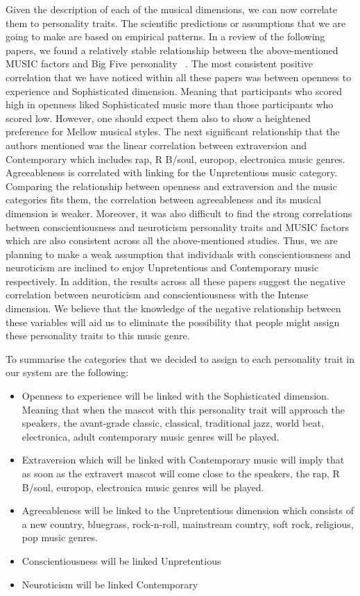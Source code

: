 Given the description of each of the musical dimensions, we can now correlate them to personality traits.
The scientific predictions or assumptions that we are going to make are based on empirical patterns.
In a review of the following papers, we found a relatively stable relationship between the
above-mentioned MUSIC factors and Big Five
personality ~\cite{schafer2017can,bonneville2013music,fricke2017personality,greenberg2016song,langmeyer2012music}.
The most consistent positive correlation that we have noticed within all these papers was
between openness to experience and Sophisticated dimension.
Meaning that participants who scored high in openness liked
Sophisticated music more than those participants who scored low.
However, one should expect them also to show a heightened preference for Mellow musical styles.
The next significant relationship that the authors mentioned was the linear correlation between
extraversion and Contemporary which includes rap, R B/soul, europop, electronica music genres.
Agreeableness is correlated with linking for the Unpretentious music category.
Comparing the relationship between openness and extraversion and the music categories fits them,
the correlation between agreeableness and its musical dimension is weaker.
Moreover, it was also difficult to find the strong correlations between
conscientiousness and neuroticism personality traits and MUSIC factors which are
also consistent across all the above-mentioned studies.
Thus, we are planning to make a weak assumption that individuals with
conscientiousness and neuroticism are inclined to enjoy Unpretentious and Contemporary music respectively.
In addition, the results across all these papers suggest the negative correlation between
neuroticism and conscientiousness with the Intense dimension.
We believe that the knowledge of the negative relationship between these variables will aid us to eliminate
the possibility that people might assign these personality traits to this music genre.

To summarise the categories that we decided to assign to each personality trait in our system are the following:
\begin{itemize}
    \item Openness to experience will be linked with the Sophisticated dimension.
    Meaning that when the mascot with this personality trait will approach the speakers,
    the avant-grade classic, classical, traditional jazz, world beat, electronica, adult
    contemporary music genres will be played.
    \item Extraversion which will be linked with Contemporary music will imply that as soon as the extravert
    mascot will come close to the speakers, the rap, R B/soul, europop, electronica music genres will be played.
    \item Agreeableness will be linked to the Unpretentious dimension which consists of a new country,
    bluegrass, rock-n-roll, mainstream country, soft rock, religious, pop music genres.
    \item Conscientiousness will be linked Unpretentious
    \item Neuroticism will be linked Contemporary
\end{itemize}

